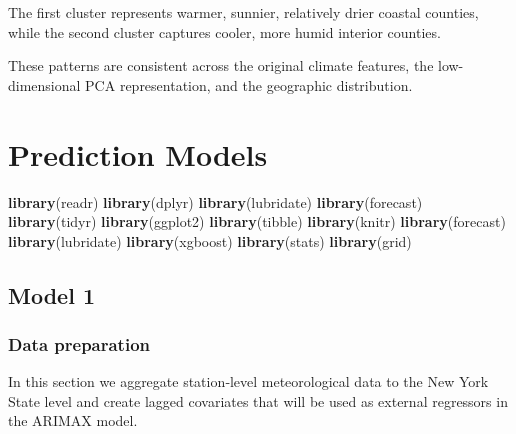 \documentclass[
]{article}
\newenvironment{Shaded}{\begin{snugshade}}{\end{snugshade}}
\newcommand{\FunctionTok}[1]{\textcolor[rgb]{0.13,0.29,0.53}{\textbf{#1}}}
\newcommand{\NormalTok}[1]{#1}
\begin{document}
The first cluster represents warmer, sunnier, relatively drier coastal
counties, while the second cluster captures cooler, more humid interior
counties.

These patterns are consistent across the original climate features, the
low-dimensional PCA representation, and the geographic distribution.

\section{\texorpdfstring{\textbf{Prediction
Models}}{Prediction Models}}\label{prediction-models}

\begin{Shaded}
\begin{Highlighting}[]
\FunctionTok{library}\NormalTok{(readr)}
\FunctionTok{library}\NormalTok{(dplyr)}
\FunctionTok{library}\NormalTok{(lubridate)}
\FunctionTok{library}\NormalTok{(forecast)}
\FunctionTok{library}\NormalTok{(tidyr)}
\FunctionTok{library}\NormalTok{(ggplot2)}
\FunctionTok{library}\NormalTok{(tibble)}
\FunctionTok{library}\NormalTok{(knitr)}
\FunctionTok{library}\NormalTok{(forecast)}
\FunctionTok{library}\NormalTok{(lubridate)}
\FunctionTok{library}\NormalTok{(xgboost)}
\FunctionTok{library}\NormalTok{(stats)}
\FunctionTok{library}\NormalTok{(grid) }
\end{Highlighting}
\end{Shaded}

\subsection{Model 1}\label{model-1}

\subsubsection{Data preparation}\label{data-preparation}

In this section we aggregate station‐level meteorological data to the
New York State level and create lagged covariates that will be used as
external regressors in the ARIMAX model.
\end{document}
